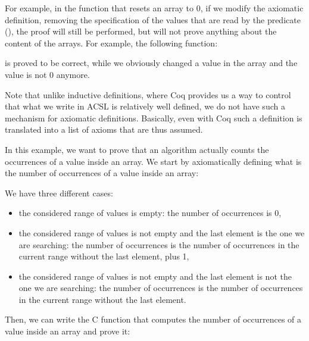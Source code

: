 For example, in the function that resets an array to 0, if we modify the
axiomatic definition, removing the specification of the values that are
read by the predicate (), the proof
will still be performed, but will not prove anything about the content
of the arrays. For example, the following function:






is proved to be correct, while we obviously changed a value in the array
and the value is not 0 anymore.



Note that unlike inductive definitions, where Coq provides us a way to control
that what we write in ACSL is relatively well defined, we do not have such a
mechanism for axiomatic definitions. Basically, even with Coq such a definition
is translated into a list of axioms that are thus assumed.





In this example, we want to prove that an algorithm actually counts the
occurrences of a value inside an array. We start by axiomatically defining
what is the number of occurrences of a value inside an array:






We have three different cases:

\begin{itemize}
\item
  the considered range of values is empty: the number of occurrences is
  0,
\item
  the considered range of values is not empty and the last element is
  the one we are searching: the number of occurrences is the number of
  occurrences in the current range without the last element, plus 1,
\item
  the considered range of values is not empty and the last element is
  not the one we are searching: the number of occurrences is the number
  of occurrences in the current range without the last element.
\end{itemize}

Then, we can write the C function that computes the number of
occurrences of a value inside an array and prove it:



